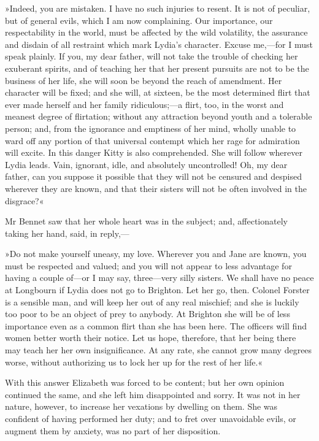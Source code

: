 »Indeed, you are mistaken. I have no such injuries to resent. It is not of peculiar, but of general evils, which I am now complaining. Our importance, our respectability in the world, must be affected by the wild volatility, the assurance and disdain of all restraint which mark Lydia's character. Excuse me,—for I must speak plainly. If you, my dear father, will not take the trouble of checking her exuberant spirits, and of teaching her that her present pursuits are not to be the business of her life, she will soon be beyond the reach of amendment. Her character will be fixed; and she will, at sixteen, be the most determined flirt that ever made herself and her family ridiculous;—a flirt, too, in the worst and meanest degree of flirtation; without any attraction beyond youth and a tolerable person; and, from the ignorance and emptiness of her mind, wholly unable to ward off any portion of that universal contempt which her rage for admiration will excite. In this danger Kitty is also comprehended. She will follow wherever Lydia leads. Vain, ignorant, idle, and absolutely uncontrolled! Oh, my dear father, can you suppose it possible that they will not be censured and despised wherever they are known, and that their sisters will not be often involved in the disgrace?«

Mr Bennet saw that her whole heart was in the subject; and, affectionately taking her hand, said, in reply,—

»Do not make yourself uneasy, my love. Wherever you and Jane are known, you must be respected and valued; and you will not appear to less advantage for having a couple of—or I may say, three—very silly sisters. We shall have no peace at Longbourn if Lydia does not go to Brighton. Let her go, then. Colonel Forster is a sensible man, and will keep her out of any real mischief; and she is luckily too poor to be an object of prey to anybody. At Brighton she will be of less importance even as a common flirt than she has been here. The officers will find women better worth their notice. Let us hope, therefore, that her being there may teach her her own insignificance. At any rate, she cannot grow many degrees worse, without authorizing us to lock her up for the rest of her life.«

With this answer Elizabeth was forced to be content; but her own opinion continued the same, and she left him disappointed and sorry. It was not in her nature, however, to increase her vexations by dwelling on them. She was confident of having performed her duty; and to fret over unavoidable evils, or augment them by anxiety, was no part of her disposition.

